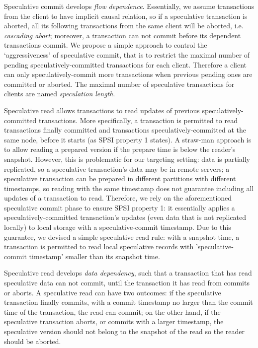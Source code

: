 Speculative commit develops \textit{flow dependence}. Essentially, we assume transactions from the client to have implicit causal relation, so if a speculative transaction is aborted, all its following transactions from the same client will be aborted, i.e. \textit{cascading abort}; moreover, a transaction can not commit before its dependent transactions commit. We propose a simple approach to control the `aggressiveness' of speculative commit, that is to restrict the maximal number of pending speculatively-committed transactions for each client. Therefore a client can only speculatively-commit more transactions when previous pending ones are committed or aborted. The maximal number of speculative transactions for clients are named \textit{speculation length}.


Speculative read allows transactions to read updates of previous speculatively-committed transactions. More specifically, a transaction is permitted to read transactions finally committed and transactions speculatively-committed at the same node, before it starts (as SPSI property 1 states). A straw-man approach is to allow reading a prepared version if the prepare time is below the reader's snapshot. However, this is problematic for our targeting setting: data is partially replicated, so a speculative transaction's data may be in remote servers; a speculative transaction can be prepared in different partitions with different timestamps, so reading with the same timestamp does not guarantee including all updates of a transaction to read. Therefore, we rely on the aforementioned speculative commit phase to ensure SPSI property 1: it essentially applies a speculatively-committed transaction's updates (even data that is not replicated locally) to local storage with a speculative-commit timestamp. Due to this guarantee, we devised a simple speculative read rule: with a snapshot time, a transaction is permitted to read local speculative records with 'speculative-commit timestamp' smaller than its snapshot time.

Speculative read develops \textit{data dependency}, such that a transaction that has read speculative data can not commit, until the transaction it has read from commits or aborts. A speculative read can have two outcomes: if the speculative transaction finally commits, with a commit timestamp no larger than the commit time of the transaction, the read can commit; on the other hand, if the speculative transaction aborts, or commits with a larger timestamp, the speculative version should not belong to the snapshot of the read so the reader should be aborted.


